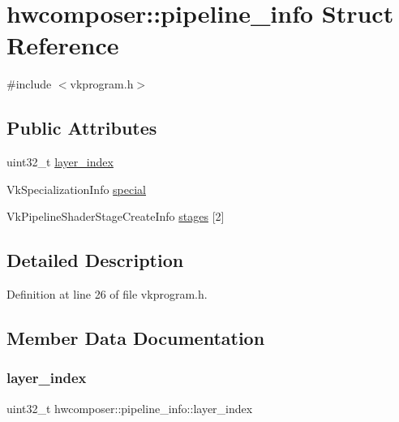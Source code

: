 \hypertarget{structhwcomposer_1_1pipeline__info}{}\section{hwcomposer\+:\+:pipeline\+\_\+info Struct Reference}
\label{structhwcomposer_1_1pipeline__info}


{\ttfamily \#include $<$vkprogram.\+h$>$}

\subsection*{Public Attributes}
\begin{DoxyCompactItemize}
\item 
uint32\+\_\+t \mbox{\hyperlink{structhwcomposer_1_1pipeline__info_a7d7849cd409ee5115444403590fa6e2e}{layer\+\_\+index}}
\item 
Vk\+Specialization\+Info \mbox{\hyperlink{structhwcomposer_1_1pipeline__info_a9bbc979fea6d45dc600939ec3910ec95}{special}}
\item 
Vk\+Pipeline\+Shader\+Stage\+Create\+Info \mbox{\hyperlink{structhwcomposer_1_1pipeline__info_aaf30bba5a055280571202ca326553b39}{stages}} \mbox{[}2\mbox{]}
\end{DoxyCompactItemize}


\subsection{Detailed Description}


Definition at line 26 of file vkprogram.\+h.



\subsection{Member Data Documentation}
\mbox{\label{structhwcomposer_1_1pipeline__info_a7d7849cd409ee5115444403590fa6e2e}} 
\subsubsection{\texorpdfstring{layer\+\_\+index}{layer\_index}}
{\footnotesize\ttfamily uint32\+\_\+t hwcomposer\+::pipeline\+\_\+info\+::layer\+\_\+index}



